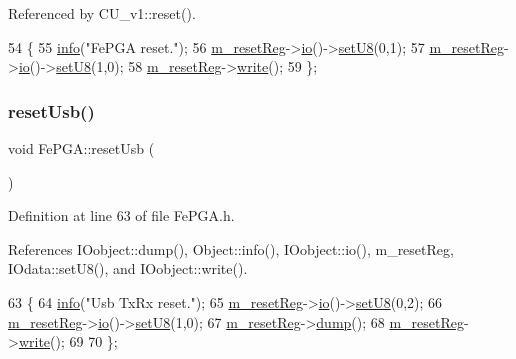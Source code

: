 Referenced by C\+U\+\_\+v1\+::reset().


\begin{DoxyCode}
54                \{
55     \hyperlink{classObject_a644fd329ea4cb85f54fa6846484b84a8}{info}(\textcolor{stringliteral}{"FePGA reset."});
56     \hyperlink{classFePGA_aeff1a2370237a06b50e1ae23d933c862}{m\_resetReg}->\hyperlink{classIOobject_af04fb94137c3d86849f478ac5afab5d1}{io}()->\hyperlink{classIOdata_a6c4fb2f2af01889ada889c2b7aceb24d}{setU8}(0,1);
57     \hyperlink{classFePGA_aeff1a2370237a06b50e1ae23d933c862}{m\_resetReg}->\hyperlink{classIOobject_af04fb94137c3d86849f478ac5afab5d1}{io}()->\hyperlink{classIOdata_a6c4fb2f2af01889ada889c2b7aceb24d}{setU8}(1,0);
58     \hyperlink{classFePGA_aeff1a2370237a06b50e1ae23d933c862}{m\_resetReg}->\hyperlink{classIOobject_a9f6984bc9f0fadcf800f1be2523ac744}{write}();
59   \};
\end{DoxyCode}
\mbox{\label{classFePGA_a79d95b2fccf4d2ea473e6cf6980d6cf6}} 
\subsubsection{\texorpdfstring{reset\+Usb()}{resetUsb()}}
{\footnotesize\ttfamily void Fe\+P\+G\+A\+::reset\+Usb (\begin{DoxyParamCaption}{ }\end{DoxyParamCaption})\hspace{0.3cm}{\ttfamily [inline]}}



Definition at line 63 of file Fe\+P\+G\+A.\+h.



References I\+Oobject\+::dump(), Object\+::info(), I\+Oobject\+::io(), m\+\_\+reset\+Reg, I\+Odata\+::set\+U8(), and I\+Oobject\+::write().


\begin{DoxyCode}
63                  \{
64     \hyperlink{classObject_a644fd329ea4cb85f54fa6846484b84a8}{info}(\textcolor{stringliteral}{"Usb TxRx reset."});
65     \hyperlink{classFePGA_aeff1a2370237a06b50e1ae23d933c862}{m\_resetReg}->\hyperlink{classIOobject_af04fb94137c3d86849f478ac5afab5d1}{io}()->\hyperlink{classIOdata_a6c4fb2f2af01889ada889c2b7aceb24d}{setU8}(0,2);
66     \hyperlink{classFePGA_aeff1a2370237a06b50e1ae23d933c862}{m\_resetReg}->\hyperlink{classIOobject_af04fb94137c3d86849f478ac5afab5d1}{io}()->\hyperlink{classIOdata_a6c4fb2f2af01889ada889c2b7aceb24d}{setU8}(1,0); 
67     \hyperlink{classFePGA_aeff1a2370237a06b50e1ae23d933c862}{m\_resetReg}->\hyperlink{classIOobject_a1247f08c84c1732a76caf07e987871e9}{dump}();
68     \hyperlink{classFePGA_aeff1a2370237a06b50e1ae23d933c862}{m\_resetReg}->\hyperlink{classIOobject_a9f6984bc9f0fadcf800f1be2523ac744}{write}();
69     
70   \};
\end{DoxyCode}
\mbox{\label{classFePGA_a2da860f836e04ecc54056d0bf8cc8f98}} 
